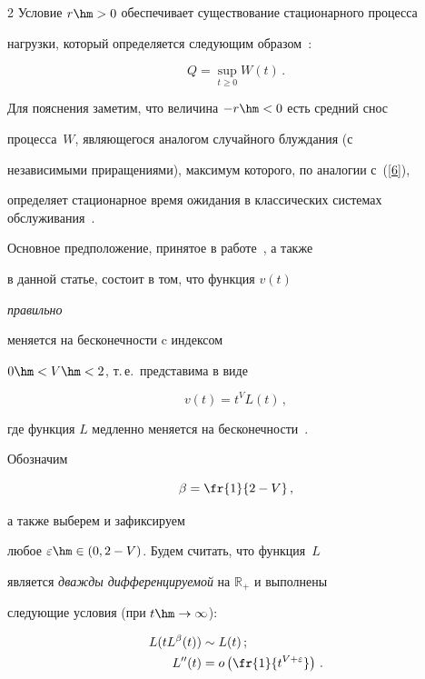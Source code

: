 \begin{multicols}{2}
Условие  $r\hm>0$ обеспечивает существование стационарного процесса


нагрузки,  который определяется следующим образом~\cite{Mandjes}:


\begin{equation}


Q= \sup\limits_{t \geq 0} W(t)\,.\label{6}


\end{equation}


 Для пояснения заметим, что величина $-r\hm<0$ есть средний снос


процесса~$W$, являющегося аналогом случайного блуждания (с


независимыми приращениями), максимум которого, по аналогии с~(\ref{6}), 


определяет стационарное время ожидания в классических системах обслуживания~\cite{Asmus}.





Основное предположение, принятое в работе~\cite{Lukashenko}, а также


в данной статье, состоит в том, что функция  $v(t)$ {\it правильно


меняется на бесконечности c индексом} $0\hm<V\hm<2$, т.\,е.\ представима в виде


\begin{equation}


v(t)=t^V L(t)\,,\label{4}


\end{equation}


где функция $L$  медленно меняется на бесконеч\-ности~\cite{Seneta}.


Обозначим 


$$


\beta=\fr{1}{2-V}\,,


$$ 


а также выберем и зафиксируем


любое $\varepsilon \hm\in (0,2-V)$. Будем  считать, что функция~$L$


является {\it дважды дифференцируемой} на $\mathbb{R}_+$ и выполнены


следующие условия (при $t \hm\to \infty$):


\begin{align}


L(tL^\beta(t)) &\sim L(t)\,;\label{10}\\


L''(t)&=o\left( \fr{1}{t^{V+\varepsilon}} \right)\,.\label{11a}



\end{align}
\end{multicols}
